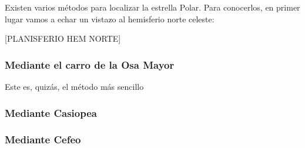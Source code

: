 \documentclass[10pt,a5paper,twoside]{amsbook}
\begin{document}
Existen varios métodos para localizar la estrella Polar. Para conocerlos, en primer lugar vamos a echar un vistazo al hemisferio norte celeste:

[PLANISFERIO HEM NORTE]

\subsubsection{Mediante el carro de la Osa Mayor}

Este es, quizás, el método más sencillo 

\subsubsection{Mediante Casiopea}
\subsubsection{Mediante Cefeo}
\end{document}
